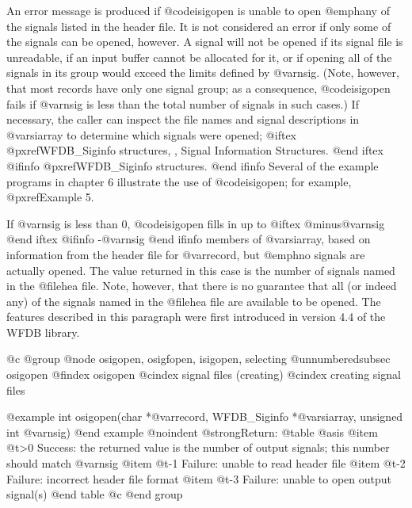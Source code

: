 {{{{{{{{{An error message is produced if @code{isigopen} is unable to open
@emph{any} of the signals listed in the header file.  It is not
considered an error if only some of the signals can be opened, however.
A signal will not be opened if its signal file is unreadable, if an
input buffer cannot be allocated for it, or if opening all of the
signals in its group would exceed the limits defined by @var{nsig}.
(Note, however, that most records have only one signal group; as a
consequence, @code{isigopen} fails if @var{nsig} is less than the
total number of signals in such cases.)  If necessary, the caller can
inspect the file names and signal descriptions in @var{siarray} to
determine which signals were opened; 
@iftex
@pxref{WFDB_Siginfo structures, , Signal Information Structures}.
@end iftex
@ifinfo
@pxref{WFDB_Siginfo structures}.
@end ifinfo
Several of the example programs in chapter 6
illustrate the use of @code{isigopen}; for example, @pxref{Example
5}.

If @var{nsig} is less than 0, @code{isigopen} fills in up to
@iftex
@minus{}@var{nsig}
@end iftex
@ifinfo
-@var{nsig}
@end ifinfo
members of @var{siarray}, based on information from the header file
for @var{record}, but @emph{no signals are actually opened}.  The value
returned in this case is the number of signals named in the @file{hea} file.
Note, however, that there is no guarantee that all (or indeed any) of the
signals named in the @file{hea} file are available to be opened.
The features described in this paragraph were first introduced in
version 4.4 of the WFDB library.

@c @group
@node     osigopen, osigfopen, isigopen, selecting
@unnumberedsubsec osigopen
@findex osigopen
@cindex signal files (creating)
@cindex creating signal files

@example
int osigopen(char *@var{record}, WFDB_Siginfo *@var{siarray}, unsigned int @var{nsig})
@end example
@noindent
@strong{Return:}
@table @asis
@item @t{>0}
Success: the returned value is the number of output signals; this number
should match @var{nsig}
@item @t{-1}
Failure: unable to read header file
@item @t{-2}
Failure: incorrect header file format
@item @t{-3}
Failure: unable to open output signal(s)
@end table
@c @end group

}}}}}}}}}
